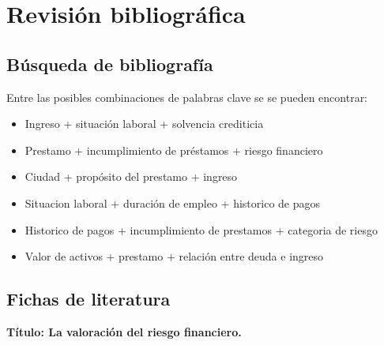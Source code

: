 \documentclass[
  letterpaper,
  DIV=11,
  numbers=noendperiod]{scrreprt}
\begin{document}
\section{Revisión bibliográfica}\label{revisiuxf3n-bibliogruxe1fica}

\subsection{Búsqueda de
bibliografía}\label{buxfasqueda-de-bibliografuxeda}

Entre las posibles combinaciones de palabras clave se se pueden
encontrar:

\begin{itemize}
\item
  Ingreso + situación laboral + solvencia crediticia
\item
  Prestamo + incumplimiento de préstamos + riesgo financiero
\item
  Ciudad + propósito del prestamo + ingreso
\item
  Situacion laboral + duración de empleo + historico de pagos
\item
  Historico de pagos + incumplimiento de prestamos + categoria de riesgo
\item
  Valor de activos + prestamo + relación entre deuda e ingreso
\end{itemize}

\subsection{Fichas de literatura}\label{fichas-de-literatura}

\textbf{Título: La valoración del riesgo financiero.}
\end{document}
